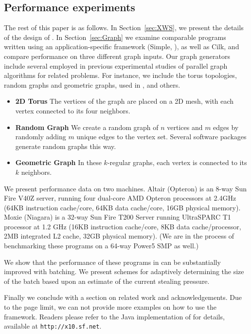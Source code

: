 \subsection{Performance experiments}

The rest of this paper is as follows. In Section~\ref{sec:XWS}, we
present the details of the design of \XWS. In Section~\ref{sec:Graph}
we examine comparable programs written using an application-specific
framework (Simple, \cite{BC04a}), as well as Cilk, and compare
performance on three different graph inputs.  Our graph generators
include several employed in previous experimental studies of parallel
graph algorithms for related problems. For instance, we include the
torus topologies, random graphs and geometric graphs, used in \cite{Gre94}, \cite{HRD97} and others.

\begin{itemize}
\itemsep0pt
\item \textbf{2D Torus} The vertices of the graph are placed on a 2D
  mesh, with each vertex connected to its four neighbors.  

\item \textbf{Random Graph} We create a random graph of $n$ vertices
  and $m$ edges by randomly adding $m$ unique edges to the vertex
  set. Several software packages generate random graphs this way.
  
\item \textbf{Geometric Graph} In these $k$-regular graphs,
  each vertex is connected to its $k$ %
  neighbors.  
\end{itemize}

We present performance data on two machines. Altair (Opteron) is an
8-way Sun Fire V40Z server, running four dual-core AMD Opteron
processors at 2.4GHz (64KB instruction cache/core, 64KB data
cache/core, 16GB physical memory). Moxie (Niagara) is a 32-way Sun
Fire T200 Server running UltraSPARC T1 processor at 1.2 GHz (16KB
instruction cache/core, 8KB data cache/processor, 2MB integrated L2
cache, 32GB physical memory). (We are in the process of benchmarking
these programs on a 64-way Power5 SMP as well.)


We show that the performance of these programs in \XWS{} can be
substantially improved with batching. We present schemes for
adaptively determining the size of the batch based upon an estimate of
the current stealing pressure.

Finally we conclude with a section on related work and acknowledgements. Due to the page limit, we can not provide more examples on how to use the \XWS{} framework. Readers please refer to the Java implementation of \XWS{} for details, available at {\tt http://x10.sf.net}.  